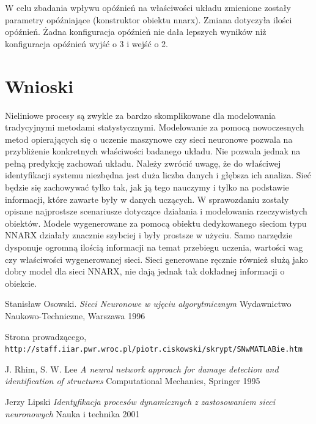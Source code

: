 \documentclass{article}
\begin{document}
W celu zbadania wpływu opóźnień na właściwości układu zmienione zostały parametry
opóźniające (konstruktor obiektu nnarx). Zmiana dotyczyła ilości opóźnień.
Żadna konfiguracja opóźnień nie dała lepszych wyników niż konfiguracja opóźnień
wyjść o 3 i wejść o 2.



\section{Wnioski}

Nieliniowe procesy są zwykle za bardzo skomplikowane dla modelowania tradycyjnymi
metodami statystycznymi. Modelowanie za pomocą nowoczesnych metod opierających
się o uczenie maszynowe czy sieci neuronowe pozwala na przybliżenie konkretnych
właściwości badanego układu. Nie pozwala jednak na pełną predykcję zachowań układu.
Należy zwrócić uwagę, że do właściwej identyfikacji systemu niezbędna jest duża
liczba danych i głębsza ich analiza. Sieć będzie się zachowywać tylko tak, jak
ją tego nauczymy i tylko na podstawie informacji, które zawarte były w danych
uczących.
W sprawozdaniu zostały opisane najprostsze scenariusze dotyczące działania
i modelowania rzeczywistych obiektów.
Modele wygenerowane za pomocą obiektu dedykowanego sieciom typu NNARX działały
znacznie szybciej i były prostsze w użyciu. Samo narzędzie dysponuje ogromną
ilością informacji na temat przebiegu uczenia, wartości wag czy właściwości
wygenerowanej sieci.
Sieci generowane ręcznie również służą jako dobry model dla sieci NNARX,
nie dają jednak tak dokładnej informacji o obiekcie.


\newpage
\begin{thebibliography}{9}

Stanisław Osowski.
\textit{Sieci Neuronowe w ujęciu algorytmicznym}
Wydawnictwo Naukowo-Techniczne, Warszawa 1996

Strona prowadzącego,
\\\texttt{http://staff.iiar.pwr.wroc.pl/piotr.ciskowski/skrypt/SNwMATLABie.htm}

J. Rhim, S. W. Lee
\textit{A neural network approach for damage detection and identification of structures}
Computational Mechanics, Springer 1995

Jerzy Lipski
\textit{Identyfikacja procesów dynamicznych z zastosowaniem sieci neuronowych}
Nauka i technika 2001

\end{thebibliography}
\end{document}
